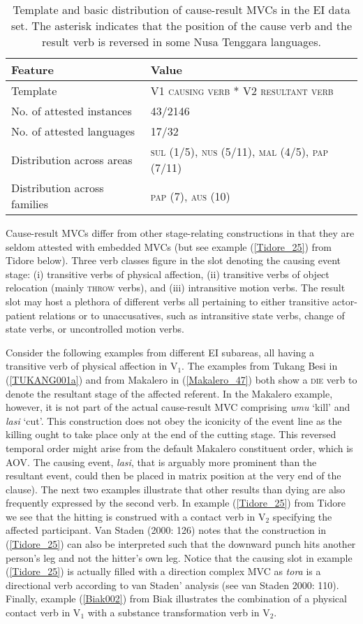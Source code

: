 \begin{table}


\begin{tabular}{ll}
\lsptoprule
Feature&Value\tabularnewline
\hline
Template&V1 \textsc{causing verb} * V2 \textsc{resultant verb}\tabularnewline
No. of attested instances& 43/2146 \tabularnewline
No. of attested languages& 17/32 \tabularnewline
Distribution across areas& \textsc{sul} (1/5), \textsc{nus} (5/11), \textsc{mal} (4/5), \textsc{pap} (7/11) \tabularnewline
Distribution across families& \textsc{pap} (7), \textsc{aus} (10) \tabularnewline
\hline
\end{tabular}
\caption[Template and basic distribution of cause-result MVCs]{Template and basic distribution of cause-result MVCs in the EI data set. The asterisk indicates that the position of the cause verb and the result verb is reversed in some Nusa Tenggara languages.}
\label{table:cause-result}
\end{table}


Cause-result MVCs differ from other stage-relating constructions in that they are seldom attested with embedded MVCs (but see example (\ref{Tidore_25}) from Tidore below). Three verb classes figure in the slot denoting the causing event stage: (i) transitive verbs of physical affection, (ii) transitive verbs of object relocation (mainly \textsc{throw} verbs), and (iii) intransitive motion verbs. The result slot may host a plethora of different verbs all pertaining to either transitive actor-patient relations or to unaccusatives, such as intransitive state verbs, change of state verbs, or uncontrolled motion verbs. 

Consider the following examples from different EI subareas, all having a transitive verb of physical affection in V$_1$. The examples from Tukang Besi in (\ref{TUKANG001a}) and from Makalero in (\ref{Makalero_47}) both show a \textsc{die} verb to denote the resultant stage of the affected referent. In the Makalero example, however, it is not part of the actual cause-result MVC comprising \textit{umu} `kill' and \textit{lasi} `cut'. This construction does not obey the iconicity of the event line as the killing ought to take place only at the end of the cutting stage. This reversed temporal order might arise from the default Makalero constituent order, which is AOV. The causing event, \textit{lasi}, that is arguably more prominent than the resultant event, could then be placed in matrix position at the very end of the clause). The next two examples illustrate that other results than dying are also frequently expressed by the second verb. In example (\ref{Tidore_25}) from Tidore we see that the hitting is construed with a contact verb in V$_2$ specifying the affected participant. Van Staden (2000: 126) notes that the construction in (\ref{Tidore_25}) can also be interpreted such that the downward punch hits another person's leg and not the hitter's own leg. Notice that the causing slot in example (\ref{Tidore_25}) is actually filled with a direction complex MVC as \textit{tora} is a directional verb according to van Staden' analysis (see van Staden 2000: 110).  Finally, example (\ref{Biak002}) from Biak illustrates the combination of a physical contact verb in V$_1$ with a substance transformation verb in V$_2$.

